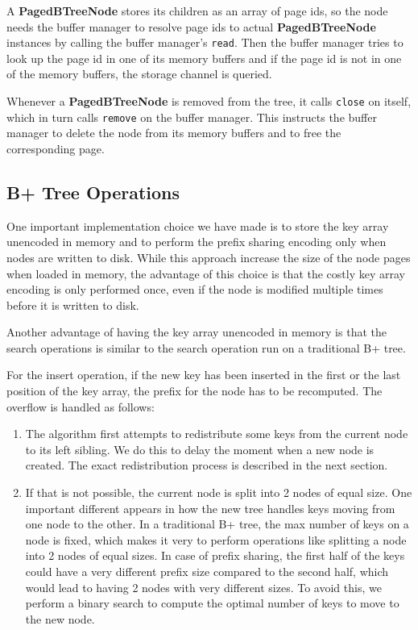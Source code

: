 \documentclass[11pt,a4paper,oneside]{article}
\begin{document}
A \textbf{PagedBTreeNode} stores its children as an array of page ids, 
so the node needs the buffer manager to resolve page ids to actual \textbf{PagedBTreeNode} instances by calling the buffer manager's \texttt{read}.
Then the buffer manager tries to look up the page id in one of its memory buffers and if the page id is not in one of the memory buffers, the storage channel is queried.

Whenever a \textbf{PagedBTreeNode} is removed from the tree, it calls \texttt{close} on itself, which in turn calls \texttt{remove} on the buffer manager.
This instructs the buffer manager to delete the node from its memory buffers and to free the corresponding page.

\subsection{B+ Tree Operations} %
\label{sub:b_tree_operations}
One important implementation choice we have made is to store the key array unencoded in memory and to perform the prefix sharing encoding only when nodes are written to disk. While this approach increase the size of the node pages when loaded in memory, the advantage of this choice is that the costly key array encoding is only performed once, even if the node is modified multiple times before it is written to disk. 

Another advantage of having the key array unencoded in memory is that the search operations is similar to the search operation run on a traditional B+ tree. 

For the insert operation, if the new key has been inserted in the first or the last position of the key array, the prefix for the node has to be recomputed. The overflow is handled as follows:
\begin{enumerate}
	\item The algorithm first attempts to redistribute some keys from the current node to its left sibling. We do this to delay the moment when a new node is created. The exact redistribution process is described in the next section.
	\item If that is not possible, the current node is split into 2 nodes of equal size. One important different appears in how the new tree handles keys moving from one node to the other. In a traditional B+ tree, the max number of keys on a node is fixed, which makes it very to perform operations like splitting a node into 2 nodes of equal sizes. In case of prefix sharing, the first half of the keys could have a very different prefix size compared to the second half, which would lead to having 2 nodes with very different sizes. To avoid this, we perform a binary search to compute the optimal number of keys to move to the new node.
\end{enumerate}
	
\end{document}
